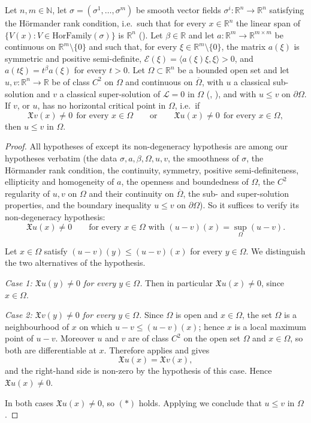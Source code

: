 \begin{corollary}
Let $n,m\in\mathbb{N}$, let $\sigma=(\sigma^1,\dots,\sigma^m)$ be smooth vector fields
$\sigma^i:\mathbb{R}^n\to\mathbb{R}^n$ satisfying the H\"ormander rank condition, i.e.\ such that
for every $x\in\mathbb{R}^n$ the linear span of $\{V(x):V\in\mathrm{HorFamily}(\sigma)\}$ is
$\mathbb{R}^n$ (). Let $\beta\in\mathbb{R}$ and let
$a:\mathbb{R}^m\to\mathbb{R}^{m\times m}$ be continuous on $\mathbb{R}^m\setminus\{0\}$ and such
that, for every $\xi\in\mathbb{R}^m\setminus\{0\}$, the matrix $a(\xi)$ is symmetric and positive
semi-definite, $\mathcal{E}(\xi)=\langle a(\xi)\xi,\xi\rangle>0$, and $a(t\xi)=t^\beta a(\xi)$ for
every $t>0$. Let $\Omega\subset\mathbb{R}^n$ be a bounded open set and let
$u,v:\mathbb{R}^n\to\mathbb{R}$ be of class $C^2$ on $\Omega$ and continuous on $\overline\Omega$,
with $u$ a classical sub-solution and $v$ a classical super-solution of $\mathcal{L}=0$ in
$\Omega$ (, ), and with $u\leq v$ on
$\partial\Omega$. If $v$, or $u$, has no horizontal critical point in $\Omega$, i.e.\ if
$$\mathfrak{X}v(x)\neq0\ \ \text{for every }x\in\Omega\qquad\text{or}\qquad
\mathfrak{X}u(x)\neq0\ \ \text{for every }x\in\Omega,$$
then $u\leq v$ in $\Omega$.
\end{corollary}
\begin{proof}
All hypotheses of  except its non-degeneracy hypothesis are among our
hypotheses verbatim (the data $\sigma,a,\beta,\Omega,u,v$, the smoothness of $\sigma$, the
H\"ormander rank condition, the continuity, symmetry, positive semi-definiteness, ellipticity and
homogeneity of $a$, the openness and boundedness of $\Omega$, the $C^2$ regularity of $u,v$ on
$\Omega$ and their continuity on $\overline\Omega$, the sub- and super-solution properties, and the
boundary inequality $u\leq v$ on $\partial\Omega$). So it suffices to verify its non-degeneracy
hypothesis:
\begin{equation*}\mathfrak{X}u(x)\neq0\qquad\text{for every }x\in\Omega\text{ with }(u-v)(x)=\sup_\Omega(u-v).
\tag{$\ast$}\end{equation*}

Let $x\in\Omega$ satisfy $(u-v)(y)\leq(u-v)(x)$ for every $y\in\Omega$. We distinguish the two
alternatives of the hypothesis.

\emph{Case 1: $\mathfrak{X}u(y)\neq0$ for every $y\in\Omega$.} Then in particular
$\mathfrak{X}u(x)\neq0$, since $x\in\Omega$.

\emph{Case 2: $\mathfrak{X}v(y)\neq0$ for every $y\in\Omega$.} Since $\Omega$ is open and
$x\in\Omega$, the set $\Omega$ is a neighbourhood of $x$ on which $u-v\leq(u-v)(x)$; hence $x$ is a
local maximum point of $u-v$. Moreover $u$ and $v$ are of class $C^2$ on the open set $\Omega$ and
$x\in\Omega$, so both are differentiable at $x$. Therefore  applies and
gives
$$\mathfrak{X}u(x)=\mathfrak{X}v(x),$$
and the right-hand side is non-zero by the hypothesis of this case. Hence
$\mathfrak{X}u(x)\neq0$.

In both cases $\mathfrak{X}u(x)\neq0$, so $(\ast)$ holds. Applying
 we conclude that $u\leq v$ in $\Omega$.
\end{proof}
